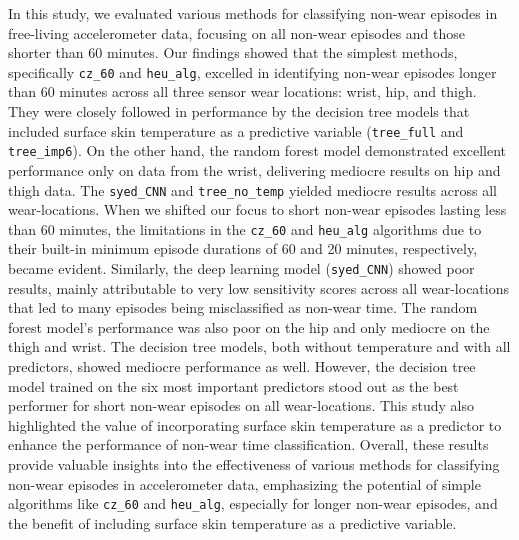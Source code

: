 \documentclass[
  10pt,
]{scrbook}
\begin{document}
In this study, we evaluated various methods for classifying non-wear
episodes in free-living accelerometer data, focusing on all non-wear
episodes and those shorter than 60 minutes. Our findings showed that the
simplest methods, specifically \texttt{cz\_60} and \texttt{heu\_alg},
excelled in identifying non-wear episodes longer than 60 minutes across
all three sensor wear locations: wrist, hip, and thigh. They were
closely followed in performance by the decision tree models that
included surface skin temperature as a predictive variable
(\texttt{tree\_full} and \texttt{tree\_imp6}). On the other hand, the
random forest model demonstrated excellent performance only on data from
the wrist, delivering mediocre results on hip and thigh data. The
\texttt{syed\_CNN} and \texttt{tree\_no\_temp} yielded mediocre results
across all wear-locations. When we shifted our focus to short non-wear
episodes lasting less than 60 minutes, the limitations in the
\texttt{cz\_60} and \texttt{heu\_alg} algorithms due to their built-in
minimum episode durations of 60 and 20 minutes, respectively, became
evident. Similarly, the deep learning model (\texttt{syed\_CNN}) showed
poor results, mainly attributable to very low sensitivity scores across
all wear-locations that led to many episodes being misclassified as
non-wear time. The random forest model's performance was also poor on
the hip and only mediocre on the thigh and wrist. The decision tree
models, both without temperature and with all predictors, showed
mediocre performance as well. However, the decision tree model trained
on the six most important predictors stood out as the best performer for
short non-wear episodes on all wear-locations. This study also
highlighted the value of incorporating surface skin temperature as a
predictor to enhance the performance of non-wear time classification.
Overall, these results provide valuable insights into the effectiveness
of various methods for classifying non-wear episodes in accelerometer
data, emphasizing the potential of simple algorithms like
\texttt{cz\_60} and \texttt{heu\_alg}, especially for longer non-wear
episodes, and the benefit of including surface skin temperature as a
predictive variable.
\end{document}
